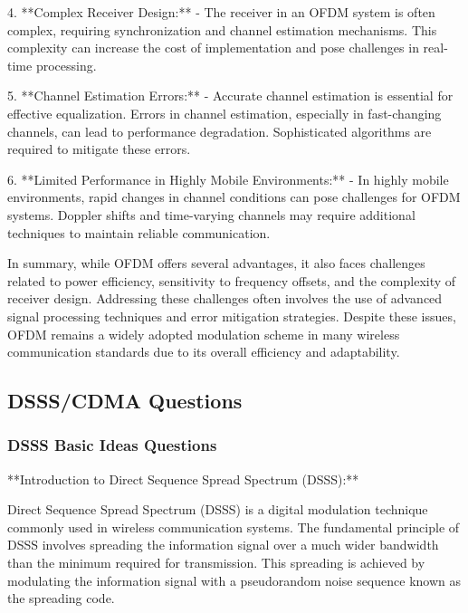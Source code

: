 \documentclass[colorlinks,11pt,a4paper,normalphoto,withhyper,ragged2e]{altareport}
\begin{document}
				4. **Complex Receiver Design:**
				- The receiver in an OFDM system is often complex, requiring synchronization and channel estimation mechanisms. This complexity can increase the cost of implementation and pose challenges in real-time processing.
				
				5. **Channel Estimation Errors:**
				- Accurate channel estimation is essential for effective equalization. Errors in channel estimation, especially in fast-changing channels, can lead to performance degradation. Sophisticated algorithms are required to mitigate these errors.
				
				6. **Limited Performance in Highly Mobile Environments:**
				- In highly mobile environments, rapid changes in channel conditions can pose challenges for OFDM systems. Doppler shifts and time-varying channels may require additional techniques to maintain reliable communication.
				
				In summary, while OFDM offers several advantages, it also faces challenges related to power efficiency, sensitivity to frequency offsets, and the complexity of receiver design. Addressing these challenges often involves the use of advanced signal processing techniques and error mitigation strategies. Despite these issues, OFDM remains a widely adopted modulation scheme in many wireless communication standards due to its overall efficiency and adaptability.
		
		
		
		
		
		
		
		
		
		
		
		
				
	\pagebreak
		
		
		
		\subsection{DSSS/CDMA Questions}
		
			\subsubsection{DSSS Basic Ideas Questions }
				
				
				
				**Introduction to Direct Sequence Spread Spectrum (DSSS):**
				
				Direct Sequence Spread Spectrum (DSSS) is a digital modulation technique commonly used in wireless communication systems. The fundamental principle of DSSS involves spreading the information signal over a much wider bandwidth than the minimum required for transmission. This spreading is achieved by modulating the information signal with a pseudorandom noise sequence known as the spreading code.
				
\end{document}

